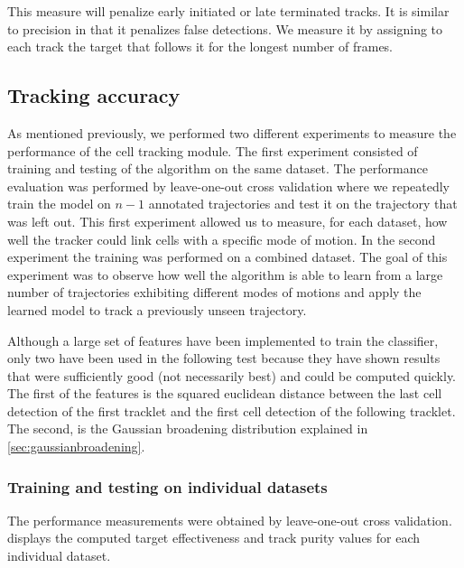 	This measure will penalize early initiated or late terminated tracks. It is similar to precision in that it penalizes false detections. We measure it by assigning to each track the target that follows it for the longest number of frames. 
	
	\subsection{Tracking accuracy}
	
	
		As mentioned previously, we performed two different experiments to measure the performance of the cell tracking module. The first experiment consisted of training and testing of the algorithm on the same dataset. The performance evaluation was performed by leave-one-out cross validation where we repeatedly train the model on $n-1$ annotated trajectories and test it on the trajectory that was left out. This first experiment allowed us to measure, for each dataset, how well the tracker could link cells with a specific mode of motion. In the second experiment the training was performed on a combined dataset. The goal of this experiment was to observe how well the algorithm is able to learn from a large number of trajectories exhibiting different modes of motions and apply the learned model to track a previously unseen trajectory.
		
		Although a large set of features have been implemented to train the classifier, only two have been used in the following test because they have shown results that were sufficiently good (not necessarily best) and could be computed quickly. The first of the features is the squared euclidean distance between the last cell detection of the first tracklet and the first cell detection of the following tracklet. The second, is the Gaussian broadening distribution explained in \cref{sec:gaussianbroadening}.
	
		\subsubsection{Training and testing on individual datasets}
		
		The performance measurements were obtained by leave-one-out cross validation.  displays the computed target effectiveness and track purity values for each individual dataset.
		
